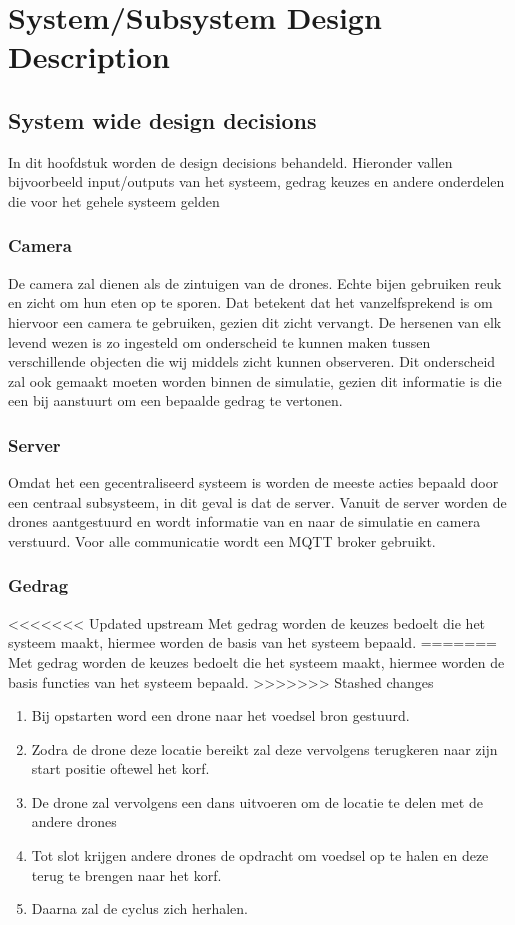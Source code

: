 \section{System/Subsystem Design Description}

\subsection{System wide design decisions}
In dit hoofdstuk worden de design decisions behandeld. Hieronder vallen bijvoorbeeld
input/outputs van het systeem, gedrag keuzes en andere onderdelen die voor het gehele systeem gelden


\subsubsection{Camera}
De camera zal dienen als de zintuigen van de drones. Echte bijen gebruiken reuk en zicht om hun eten op te sporen. Dat betekent dat het vanzelfsprekend is om hiervoor een camera te gebruiken, gezien dit zicht vervangt. De hersenen van elk levend wezen is zo ingesteld om onderscheid te kunnen maken tussen verschillende objecten die wij middels zicht kunnen observeren. Dit onderscheid zal ook gemaakt moeten worden binnen de simulatie, gezien dit informatie is die een bij aanstuurt om een bepaalde gedrag te vertonen.

\subsubsection{Server}
Omdat het een gecentraliseerd systeem is worden de meeste acties bepaald door een centraal subsysteem, in dit geval is dat de server.
Vanuit de server worden de drones aantgestuurd en wordt informatie van en naar de simulatie en camera verstuurd. Voor alle communicatie
wordt een MQTT broker gebruikt.

\subsubsection*{Gedrag}
<<<<<<< Updated upstream
Met gedrag worden de keuzes bedoelt die het systeem maakt, hiermee worden de basis van het systeem bepaald.
=======
Met gedrag worden de keuzes bedoelt die het systeem maakt, hiermee worden de basis functies van het systeem bepaald.
>>>>>>> Stashed changes
\begin{enumerate}
    \item Bij opstarten word een drone naar het voedsel bron gestuurd.
    \item Zodra de drone deze locatie bereikt zal deze vervolgens terugkeren naar zijn start positie oftewel het korf.
    \item De drone zal vervolgens een dans uitvoeren om de locatie te delen met de andere drones
    \item Tot slot krijgen andere drones de opdracht om voedsel op te halen en deze terug te brengen naar het korf.
    \item Daarna zal de cyclus zich herhalen.
\end{enumerate}

